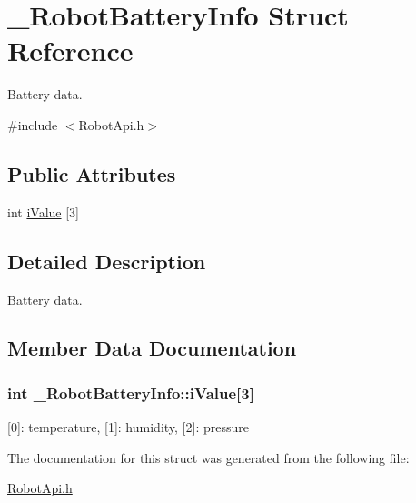\hypertarget{struct__RobotBatteryInfo}{\section{\+\_\+\+Robot\+Battery\+Info Struct Reference}
\label{struct__RobotBatteryInfo}
}


Battery data.  




{\ttfamily \#include $<$Robot\+Api.\+h$>$}

\subsection*{Public Attributes}
\begin{DoxyCompactItemize}
\item 
int \hyperlink{struct__RobotBatteryInfo_a32d251261c450710c7fab260507e4383}{i\+Value} \mbox{[}3\mbox{]}
\end{DoxyCompactItemize}


\subsection{Detailed Description}
Battery data. 

\subsection{Member Data Documentation}
\hypertarget{struct__RobotBatteryInfo_a32d251261c450710c7fab260507e4383}{
\subsubsection[{i\+Value}]{\setlength{\rightskip}{0pt plus 5cm}int \+\_\+\+Robot\+Battery\+Info\+::i\+Value\mbox{[}3\mbox{]}}}\label{struct__RobotBatteryInfo_a32d251261c450710c7fab260507e4383}
\mbox{[}0\mbox{]}\+: temperature, \mbox{[}1\mbox{]}\+: humidity, \mbox{[}2\mbox{]}\+: pressure 

The documentation for this struct was generated from the following file\+:\begin{DoxyCompactItemize}
\item 
\hyperlink{RobotApi_8h}{Robot\+Api.\+h}\end{DoxyCompactItemize}
